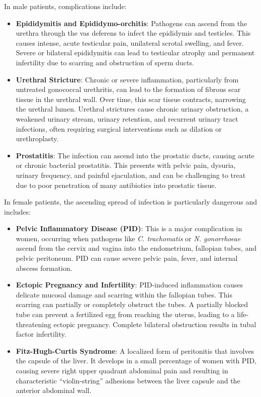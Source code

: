 In male patients, complications include:
\begin{itemize}
    \item \textbf{Epididymitis and Epididymo-orchitis}: Pathogens can ascend from the urethra through the vas deferens to infect the epididymis and testicles. This causes intense, acute testicular pain, unilateral scrotal swelling, and fever. Severe or bilateral epididymitis can lead to testicular atrophy and permanent infertility due to scarring and obstruction of sperm ducts.

    \item \textbf{Urethral Stricture}: Chronic or severe inflammation, particularly from untreated gonococcal urethritis, can lead to the formation of fibrous scar tissue in the urethral wall. Over time, this scar tissue contracts, narrowing the urethral lumen. Urethral strictures cause chronic urinary obstruction, a weakened urinary stream, urinary retention, and recurrent urinary tract infections, often requiring surgical interventions such as dilation or urethroplasty.

    \item \textbf{Prostatitis}: The infection can ascend into the prostatic ducts, causing acute or chronic bacterial prostatitis. This presents with pelvic pain, dysuria, urinary frequency, and painful ejaculation, and can be challenging to treat due to poor penetration of many antibiotics into prostatic tissue.
\end{itemize}

In female patients, the ascending spread of infection is particularly dangerous and includes:
\begin{itemize}
    \item \textbf{Pelvic Inflammatory Disease (PID)}: This is a major complication in women, occurring when pathogens like \textit{C. trachomatis} or \textit{N. gonorrhoeae} ascend from the cervix and vagina into the endometrium, fallopian tubes, and pelvic peritoneum. PID can cause severe pelvic pain, fever, and internal abscess formation.

    \item \textbf{Ectopic Pregnancy and Infertility}: PID-induced inflammation causes delicate mucosal damage and scarring within the fallopian tubes. This scarring can partially or completely obstruct the tubes. A partially blocked tube can prevent a fertilized egg from reaching the uterus, leading to a life-threatening ectopic pregnancy. Complete bilateral obstruction results in tubal factor infertility.

    \item \textbf{Fitz-Hugh-Curtis Syndrome}: A localized form of peritonitis that involves the capsule of the liver. It develops in a small percentage of women with PID, causing severe right upper quadrant abdominal pain and resulting in characteristic ``violin-string'' adhesions between the liver capsule and the anterior abdominal wall.
\end{itemize}

